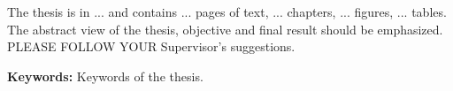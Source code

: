 \vspace{-2.5em}
The thesis is in ... and contains ... pages of text, ... chapters, ... figures, ... tables.
The abstract view of the thesis, objective and final result should be emphasized. PLEASE FOLLOW YOUR Supervisor's suggestions.

\textbf{Keywords:} Keywords of the thesis. 